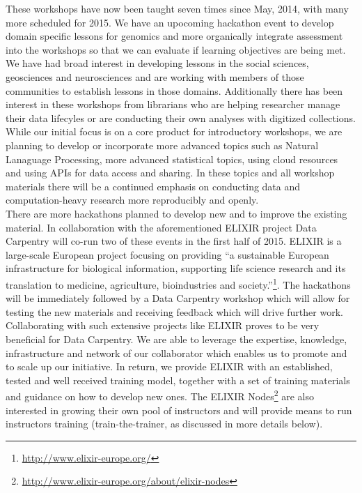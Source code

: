\documentclass[15]{idcc}
\begin{document}
\begin{itemize}
These workshops have now been taught seven times since May, 2014, with many more scheduled for 2015. We have an
  upocoming hackathon event to develop domain specific lessons for genomics and more organically integrate assessment
  into the workshops so that we can evaluate if learning objectives are being met. We have had broad interest in developing lessons
  in the social sciences, geosciences and neurosciences and are working with members of those communities to establish lessons in those
  domains. Additionally there has been interest in these workshops from librarians who are helping researcher manage their data lifecyles
 or are conducting their own analyses with digitized collections.\\

 While our initial focus is on a core product for introductory workshops, we are planning to develop or incorporate more advanced topics
 such as Natural Lanaguage Processing, more advanced statistical topics, using cloud resources and using APIs for data access and sharing. In these topics and all workshop materials there will be a continued emphasis on conducting data and computation-heavy research more reproducibly and openly.\\

There are more hackathons planned to develop new and to improve the existing material. In collaboration with the aforementioned ELIXIR project Data Carpentry will co-run two
of these events in the first half of 2015. ELIXIR is a large-scale European project focusing on providing ``a sustainable European infrastructure for biological information,
supporting life science research and its translation to medicine, agriculture, bioindustries and society.''\footnote{\url{http://www.elixir-europe.org/}}.
The hackathons will be immediately followed by a Data Carpentry workshop which will allow for testing the new materials and receiving feedback which will
drive further work. Collaborating with such extensive projects like ELIXIR proves to be very beneficial for Data Carpentry. We are able to leverage
the expertise, knowledge, infrastructure and network of our collaborator which enables us to promote and to scale up our initiative. In return, we provide ELIXIR with
an established, tested and well received training model, together with a set of training materials and guidance on how to develop new ones. The ELIXIR
Nodes\footnote{\url{http://www.elixir-europe.org/about/elixir-nodes}} are also interested in growing their own pool of instructors and will provide means
to run instructors training (train-the-trainer, as discussed in more details below). \\


\end{itemize}
\end{document}
